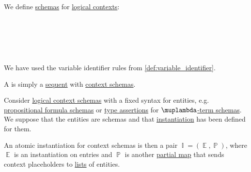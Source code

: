 \begin{definition}\label{def:logical_context_schema}\mimprovised
  We define \hyperref[con:schemas_and_instances]{schemas} for \hyperref[def:logical_context]{logical contexts}:
  \begin{bnf*}
     {} \\
        { \bnfor {} \bnfor} \\
     \\
           {\bnfves} \\
                 { \bnfor {}}
  \end{bnf*}

  We have used the variable identifier rules from \cref{def:variable_identifier}.
\end{definition}

\begin{definition}\label{def:sequent_schema}\mimprovised
  A  is simply a \hyperref[def:sequent]{sequent} with \hyperref[def:logical_context_schema]{context schemas}.
\end{definition}

\begin{definition}\label{def:atomic_context_instantiation}
  Consider \hyperref[def:logical_context_schema]{logical context schemas} with a fixed syntax for entities, e.g. \hyperref[def:propositional_formula_schema]{propositional formula schemas} or \hyperref[def:type_assertion]{type assertions} for \hyperref[def:lambda_term_schema]{\( \muplambda \)-term schemas}. We suppose that the entities are schemas and that \hyperref[con:schemas_and_instances]{instantiation} has been defined for them.

  An atomic instantiation for context schemas is then a pair \( \BbbI = (\BbbE, \BbbP) \), where \( \BbbE \) is an instantiation on entries and \( \BbbP \) is another \hyperref[def:partial_function]{partial map} that sends context placeholders to \hyperref[def:ordered_tuple]{lists} of entities.
\end{definition}

